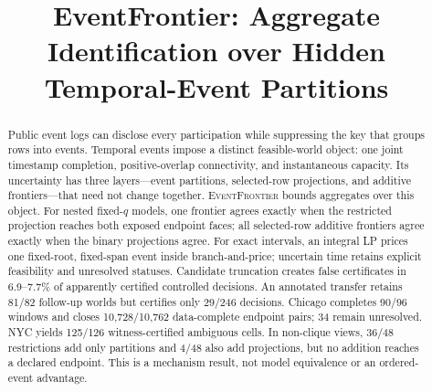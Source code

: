 \documentclass[sigconf,anonymous,review]{acmart}
\title{EventFrontier: Aggregate Identification over Hidden Temporal-Event Partitions}
\newcommand{\methodname}{\textsc{EventFrontier}}
\begin{document}
\begin{abstract}
Public event logs can disclose every participation while suppressing the key
that groups rows into events. Temporal events impose a distinct feasible-world
object: one joint timestamp completion, positive-overlap connectivity, and
instantaneous capacity. Its uncertainty has three layers---event partitions,
selected-row projections, and additive frontiers---that need not change
together. \methodname{} bounds aggregates over this object. For nested fixed-$q$
models, one frontier agrees exactly when the restricted projection reaches both
exposed endpoint faces; all selected-row additive frontiers agree exactly when
the binary projections agree. For exact intervals, an integral LP prices one
fixed-root, fixed-span event inside branch-and-price; uncertain time retains
explicit feasibility and unresolved statuses. Candidate truncation creates
false certificates in 6.9--7.7\% of apparently certified controlled decisions.
An annotated transfer retains 81/82 follow-up worlds but certifies only 29/246
decisions. Chicago completes 90/96 windows and closes 10,728/10,762
data-complete endpoint pairs; 34 remain unresolved. NYC yields 125/126
witness-certified ambiguous cells. In non-clique views, 36/48 restrictions add
only partitions and 4/48 also add projections, but no addition reaches a
declared endpoint. This is a mechanism result, not model equivalence or an
ordered-event advantage.
\end{abstract}
\maketitle








\clearpage
\balance


\clearpage
\nobalance
\appendix

\clearpage
\end{document}
